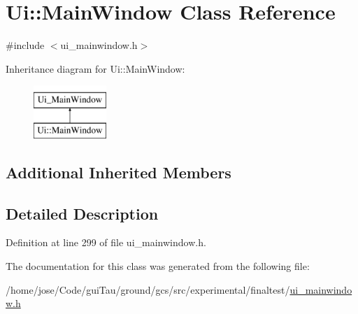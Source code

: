 \hypertarget{class_ui_1_1_main_window}{\section{Ui\-:\-:Main\-Window Class Reference}
\label{class_ui_1_1_main_window}
}


{\ttfamily \#include $<$ui\-\_\-mainwindow.\-h$>$}

Inheritance diagram for Ui\-:\-:Main\-Window\-:\begin{figure}[H]
\begin{center}
\leavevmode
\includegraphics[height=2.000000cm]{class_ui_1_1_main_window}
\end{center}
\end{figure}
\subsection*{Additional Inherited Members}


\subsection{Detailed Description}


Definition at line 299 of file ui\-\_\-mainwindow.\-h.



The documentation for this class was generated from the following file\-:\begin{DoxyCompactItemize}
\item 
/home/jose/\-Code/gui\-Tau/ground/gcs/src/experimental/finaltest/\hyperlink{ui__mainwindow_8h}{ui\-\_\-mainwindow.\-h}\end{DoxyCompactItemize}
